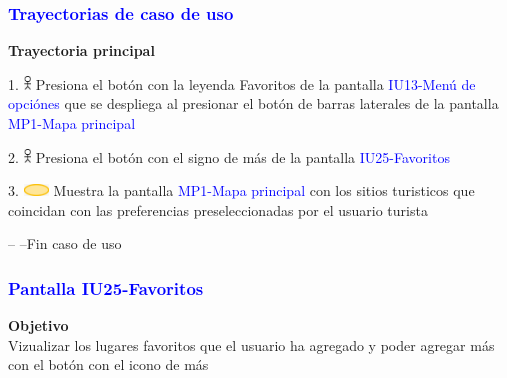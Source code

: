 \pagebreak
\subsubsection{\textcolor{blue}{Trayectorias de caso de uso}}
\textbf{Trayectoria principal}
    
    1. \includegraphics[width=0.0150\textwidth]{Figuras/persona.png} Presiona el botón con la leyenda Favoritos de la pantalla  \textcolor{blue}{IU13-Menú de opciónes} que se despliega al presionar el botón de barras laterales de la pantalla \textcolor{blue}{MP1-Mapa principal}
    
      2. \includegraphics[width=0.0150\textwidth]{Figuras/PERSONA.png} Presiona el botón con el signo de más de la pantalla \textcolor{blue}{IU25-Favoritos}

    3. \includegraphics[width=0.0500\textwidth]{Figuras/sistema.png} Muestra la pantalla \textcolor{blue}{MP1-Mapa principal} con los sitios turisticos que coincidan con las preferencias preseleccionadas por el usuario turista

    -- --Fin caso de uso
    
\subsubsection{\textcolor{blue}{Pantalla IU25-Favoritos}}

\textbf{Objetivo} \\
Vizualizar los lugares favoritos que el usuario ha agregado y poder agregar más con el botón con el icono de más

